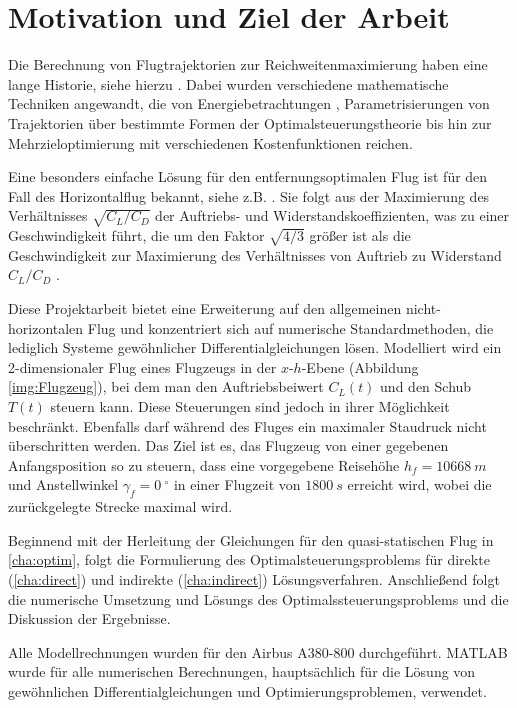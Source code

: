 \chapter{Motivation und Ziel der Arbeit}
Die Berechnung von Flugtrajektorien zur Reichweitenmaximierung haben eine lange Historie, siehe hierzu \cite{Burrows1982, Murrieta2016, Schaback2017, Pierson1989}.  Dabei wurden verschiedene mathematische Techniken angewandt, die von Energiebetrachtungen \cite{Calise1977}, Parametrisierungen von Trajektorien \cite{Burrows1982} über bestimmte Formen der Optimalsteuerungstheorie \cite{Javier2016} bis hin zur Mehrzieloptimierung mit verschiedenen Kostenfunktionen \cite{Gardi2016} reichen. 

Eine besonders einfache Lösung für den entfernungsoptimalen Flug ist für den Fall des Horizontalflug bekannt, siehe z.B. \cite{Peckham1974}. Sie folgt aus der Maximierung des Verhältnisses $\sqrt{C_{L}/C_{D}}$ der Auftriebs- und Widerstandskoeffizienten, was zu einer Geschwindigkeit führt, die um den Faktor $\sqrt{4/3}$ größer ist als die Geschwindigkeit zur Maximierung des Verhältnisses von Auftrieb zu Widerstand $C_{L}/C_{D}$ \cite{Schaback2017}.  

Diese Projektarbeit bietet eine Erweiterung auf den allgemeinen nicht-horizontalen Flug und konzentriert sich auf numerische Standardmethoden, die lediglich Systeme gewöhnlicher Differentialgleichungen lösen. Modelliert wird ein 2-dimensionaler Flug eines Flugzeugs in der $x$-$h$-Ebene (Abbildung \ref{img:Flugzeug}), bei dem man den Auftriebsbeiwert $C_L(t)$ und den Schub $T(t)$ steuern kann. Diese Steuerungen sind jedoch in ihrer Möglichkeit beschränkt. Ebenfalls darf während des Fluges ein maximaler Staudruck nicht überschritten werden. Das Ziel ist es, das Flugzeug von einer gegebenen Anfangsposition so zu steuern, dass eine vorgegebene Reisehöhe $h_f = 10668\ m$ und Anstellwinkel $\gamma_f = 0\ ^{\circ}$ in einer Flugzeit von $1800 \ s$ erreicht  wird, wobei die zurückgelegte Strecke maximal wird.


Beginnend mit der Herleitung der Gleichungen für den quasi-statischen Flug in \autoref{cha:optim}, folgt die Formulierung des Optimalsteuerungsproblems für direkte (\autoref{cha:direct}) und indirekte (\autoref{cha:indirect}) Lösungsverfahren. Anschließend folgt die numerische Umsetzung und Lösungs des Optimalssteuerungsproblems und die Diskussion der Ergebnisse.

Alle Modellrechnungen wurden für den Airbus A380-800 \cite{A380Tech} durchgeführt. MATLAB wurde für alle numerischen Berechnungen, hauptsächlich für die Lösung von gewöhnlichen Differentialgleichungen und Optimierungsproblemen, verwendet.

